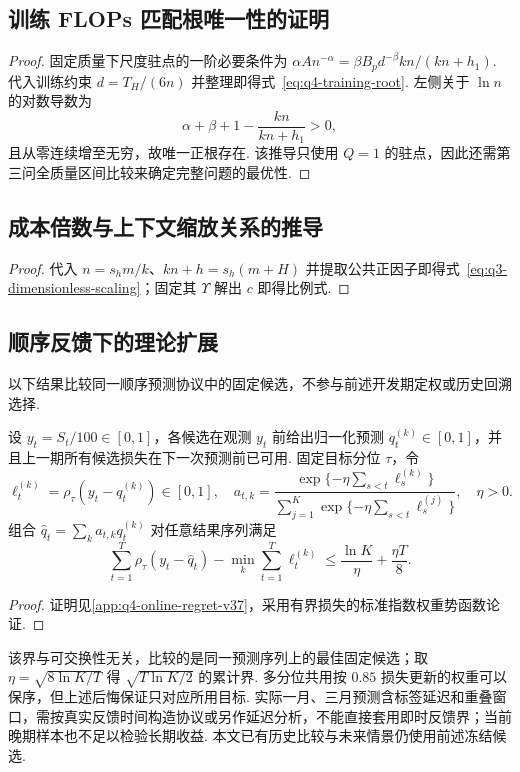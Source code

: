 \subsection{训练 FLOPs 匹配根唯一性的证明}\label{app:q4-training-root-proof}
\begin{proof}
固定质量下尺度驻点的一阶必要条件为 $\alpha An^{-\alpha}=\beta B_pd^{-\beta}kn/(kn+h_1)$. 代入训练约束 $d=T_H/(6n)$ 并整理即得式~\eqref{eq:q4-training-root}. 左侧关于 $\ln n$ 的对数导数为
\[
\alpha+\beta+1-\frac{kn}{kn+h_1}>0,
\]
且从零连续增至无穷，故唯一正根存在. 该推导只使用 $Q=1$ 的驻点，因此还需第三问全质量区间比较来确定完整问题的最优性. 
\end{proof}

\subsection{成本倍数与上下文缩放关系的推导}\label{app:q3-scaling-proof}
\begin{proof}代入 $n=s_hm/k$、$kn+h=s_h(m+H)$ 并提取公共正因子即得式~\eqref{eq:q3-dimensionless-scaling}；固定其 $\Upsilon$ 解出 $c$ 即得比例式. \end{proof}

\subsection{顺序反馈下的理论扩展}\label{app:q4-online-extension}
以下结果比较同一顺序预测协议中的固定候选，不参与前述开发期定权或历史回溯选择. 
\begin{proposition}[指数加权分位预测的累计后悔界]\label{thm:q4-online-regret-v37}
设 $y_t=S_t/100\in[0,1]$，各候选在观测 $y_t$ 前给出归一化预测 $q_t^{(k)}\in[0,1]$，并且上一期所有候选损失在下一次预测前已可用. 固定目标分位 $\tau$，令
\[
\ell_t^{(k)}=\rho_\tau(y_t-q_t^{(k)})\in[0,1],\quad
a_{t,k}=\frac{\exp\{-\eta\sum_{s<t}\ell_s^{(k)}\}}
{\sum_{j=1}^K\exp\{-\eta\sum_{s<t}\ell_s^{(j)}\}},\quad\eta>0.
\]
组合 $\widehat q_t=\sum_ka_{t,k}q_t^{(k)}$ 对任意结果序列满足
\begin{equation}\label{eq:q4-online-regret-v37}
\sum_{t=1}^T\rho_\tau(y_t-\widehat q_t)
-\min_k\sum_{t=1}^T\ell_t^{(k)}
\le\frac{\ln K}{\eta}+\frac{\eta T}{8}.
\end{equation}
\end{proposition}
\begin{proof}
证明见\ref{app:q4-online-regret-v37}，采用有界损失的标准指数权重势函数论证\cite{freund_schapire}. 
\end{proof}
该界与可交换性无关，比较的是同一预测序列上的最佳固定候选；取 $\eta=\sqrt{8\ln K/T}$ 得 $\sqrt{T\ln K/2}$ 的累计界. 多分位共用按 $0.85$ 损失更新的权重可以保序，但上述后悔保证只对应所用目标. 实际一月、三月预测含标签延迟和重叠窗口，需按真实反馈时间构造协议或另作延迟分析，不能直接套用即时反馈界；当前晚期样本也不足以检验长期收益. 本文已有历史比较与未来情景仍使用前述冻结候选. 


